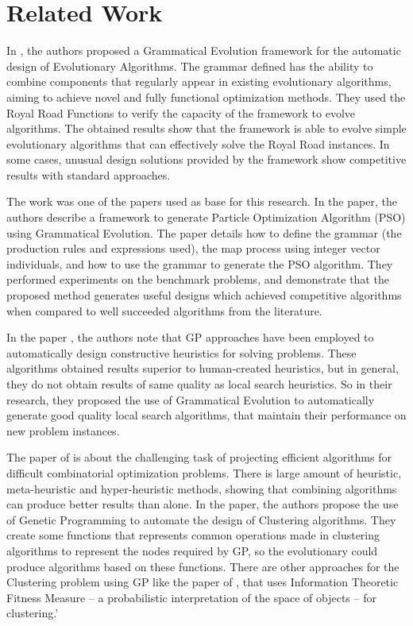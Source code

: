 \documentclass[journal]{IEEEtran}
\begin{document}
	
	\section{Related Work} \label{sec:related_work}
	
	In \cite{lourencco2012evolving}, the authors proposed a Grammatical Evolution framework for the automatic design of Evolutionary Algorithms. The grammar defined has the ability to combine components that regularly appear in existing evolutionary algorithms, aiming to achieve novel and fully functional optimization methods. They used the Royal Road Functions to verify the capacity of the framework to evolve algorithms. The obtained results show that the framework is able to evolve simple evolutionary algorithms that can effectively solve the Royal Road instances. In some cases, unusual design solutions provided by the framework show competitive results with standard approaches.
	
	The work \cite{miranda2015gefpso} was one of the papers used as base for this research. In the paper, the authors describe a framework to generate Particle Optimization Algorithm (PSO) using Grammatical Evolution. The paper details how to define the grammar (the production rules and expressions used), the map process using integer vector individuals, and how to use the grammar to generate the PSO algorithm. They performed experiments on the benchmark problems, and demonstrate that the proposed method generates useful designs which achieved competitive algorithms when compared to well succeeded algorithms from the literature.
	
	In the paper \cite{burke2012grammatical}, the authors note that GP approaches have been employed to automatically design constructive heuristics for solving problems. These algorithms obtained results superior to human-created heuristics, but in general, they do not obtain results of same quality as local search heuristics. So in their research, they proposed the use of Grammatical Evolution to automatically generate good quality local search algorithms, that maintain their performance on new problem instances.
		
	The paper of \cite{bolton2015optimizing} is about the challenging task of projecting efficient algorithms for difficult combinatorial optimization problems. There is large amount of heuristic, meta-heuristic and hyper-heuristic methods, showing that combining algorithms can produce better results than alone. In the paper, the authors propose the use of Genetic Programming to automate the design of Clustering algorithms. They create some functions that represents common operations made in clustering algorithms to represent the nodes required by GP, so the evolutionary could produce algorithms based on these functions. There are other approaches for the Clustering problem using GP like the paper of \cite{boric2007genetic}, that uses Information Theoretic Fitness Measure -- a probabilistic interpretation of the space of objects -- for clustering.'
	
\end{document}

